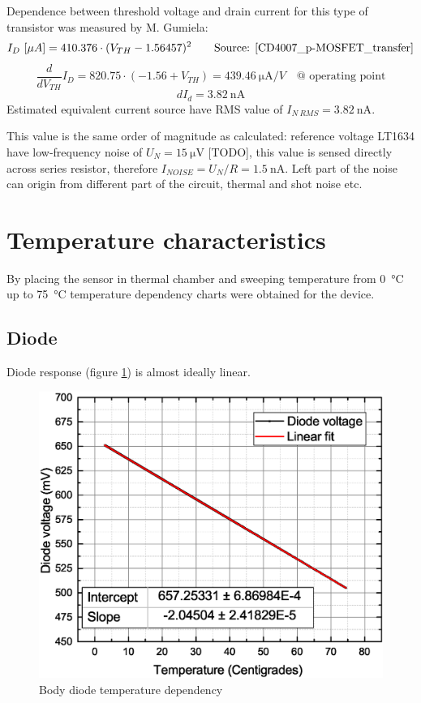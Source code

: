         Dependence between threshold voltage and drain current for this type of transistor was measured by M. Gumiela:
        $$I_D~[\mu A] = 410.376 \cdot (V_{TH} - 1.56457)^2 \text{~~~~~~Source: \ref{CD4007_p-MOSFET_transfer}}$$
        $$\frac{\textit{d}}{\textit{d}V_{TH}} I_D= 820.75 \cdot (-1.56 + V_{TH}) = \SI{439.46}{\uA/V} \text{~~~@ operating point}$$
        $$\textit{d}I_d = \SI{3.82}{\nA}$$
        Estimated equivalent current source have RMS value of $I_{N~RMS} = \SI{3.82}{\nA}$.

        This value is the same order of magnitude as calculated: reference voltage LT1634 have low-frequency noise of $U_N = \SI{15}{\uV}$ [TODO], this value is sensed directly across series resistor, therefore $I_{NOISE} = U_N/R = \SI{1.5}{\nA}$. Left part of the noise can origin from different part of the circuit, thermal and shot noise etc. %



\section{Temperature characteristics}
    By placing the sensor in thermal chamber and sweeping temperature from \SI{0}{\degreeCelsius} up to \SI{75}{\degreeCelsius} temperature dependency charts were obtained for the device.

    \subsection{Diode}
        Diode response (figure \ref{Body_diode_temperature_dependency}) is almost ideally linear.
        \begin{figure}[H]
            \centering
            \includegraphics[width=0.6\paperwidth]{img/07/diodeVsTemperature.eps}
            \caption{Body diode temperature dependency}
            \label{Body_diode_temperature_dependency}
        \end{figure}


